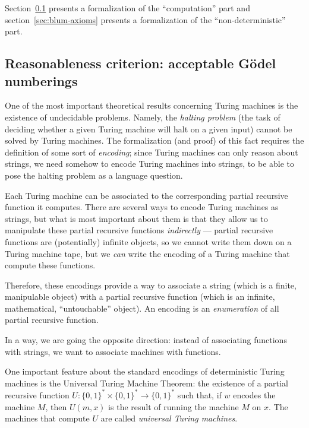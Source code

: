 \documentclass[12pt]{article}
\theoremstyle{definition}
\begin{document}
Section~\ref{sec:godel-numberings}
presents a formalization of the ``computation'' part
and section~\ref{sec:blum-axioms}
presents a formalization of the ``non-deterministic'' part.

\subsection{Reasonableness criterion: acceptable Gödel numberings}
\label{sec:godel-numberings}

One of the most important theoretical results concerning Turing machines
is the existence of undecidable problems.
Namely, the \emph{halting problem}
(the task of deciding whether a given Turing machine will halt on a given input)
cannot be solved by Turing machines.
The formalization (and proof) of this fact
requires the definition of some sort of \emph{encoding};
since Turing machines can only reason about strings,
we need somehow to encode Turing machines into strings,
to be able to pose the halting problem as a language question.

Each Turing machine can be associated
to the corresponding partial recursive function it computes.
There are several ways to encode Turing machines as strings,
but what is most important about them is that they allow us
to manipulate these partial recursive functions \emph{indirectly}
--- partial recursive functions are (potentially) infinite objects,
so we cannot write them down on a Turing machine tape,
but we \emph{can} write the encoding of a Turing machine that compute these functions.

Therefore,
these encodings provide a way to associate a string
(which is a finite, manipulable object)
with a partial recursive function
(which is an infinite, mathematical, ``untouchable'' object).
An encoding is an \emph{enumeration} of all partial recursive function.

In a way,
we are going the opposite direction:
instead of associating functions with strings,
we want to associate machines with functions.

One important feature about the standard encodings of deterministic Turing machines
is the Universal Turing Machine Theorem:
the existence of a partial recursive function
$U: \{0, 1\}^* \times \{0, 1\}^* \to \{0, 1\}^*$
such that, if $w$ encodes the machine $M$,
then $U(m, x)$ is the result of running the machine $M$ on $x$.
The machines that compute $U$ are called \emph{universal Turing machines}.
\end{document}
